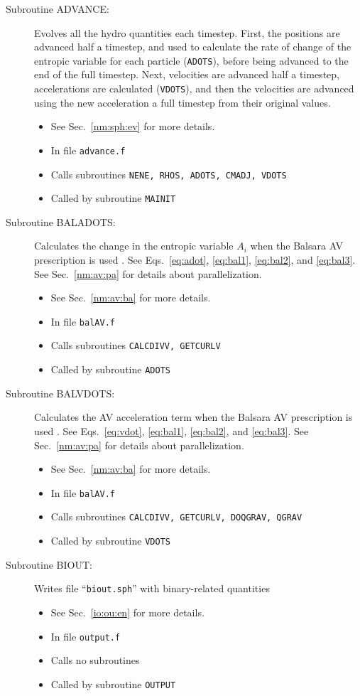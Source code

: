 \begin{description}
\item[Subroutine ADVANCE:] Evolves all the hydro quantities each timestep.
First, the positions are advanced half a timestep, and used to calculate the
rate of change of the entropic variable for each particle ({\tt ADOTS}), 
before being advanced to the end 
of the full timestep.  Next, velocities are advanced half a timestep, 
accelerations are calculated ({\tt VDOTS}), 
and then the velocities are advanced
using the new acceleration a full timestep from their original values.
\begin{itemize} 
\item See Sec.~\ref{nm:sph:ev} for more details.
\item In file {\tt advance.f}
\item Calls subroutines {\tt NENE, RHOS, ADOTS, CMADJ, VDOTS}
\item Called by subroutine {\tt MAINIT}
\end{itemize}

\item[Subroutine BALADOTS:] Calculates the change in the entropic 
variable $A_i$ when the Balsara AV prescription is used \citep{balAV}.  
See Eqs.~\ref{eq:adot}, \ref{eq:bal1}, \ref{eq:bal2}, and \ref{eq:bal3}.  
See Sec.~\ref{nm:av:pa} for
details about parallelization.
\begin{itemize} 
\item See Sec.~\ref{nm:av:ba} for more details.
\item In file {\tt balAV.f}
\item Calls subroutines {\tt CALCDIVV, GETCURLV}
\item Called by subroutine {\tt ADOTS}
\end{itemize}

\item[Subroutine BALVDOTS:] Calculates the AV acceleration term 
when the Balsara AV prescription is used \citep{balAV}.  
See Eqs.~\ref{eq:vdot}, \ref{eq:bal1}, \ref{eq:bal2}, and \ref{eq:bal3}.  
See Sec.~\ref{nm:av:pa} for
details about parallelization.
\begin{itemize} 
\item See Sec.~\ref{nm:av:ba} for more details.
\item In file {\tt balAV.f}
\item Calls subroutines {\tt CALCDIVV, GETCURLV, DOQGRAV, QGRAV}
\item Called by subroutine {\tt VDOTS}
\end{itemize}

\item[Subroutine BIOUT:] Writes file ``{\tt biout.sph}'' with 
binary-related quantities
\begin{itemize} 
\item See Sec.~\ref{io:ou:en} for more details.
\item In file {\tt output.f}
\item Calls no subroutines 
\item Called by subroutine {\tt OUTPUT}
\end{itemize}


\end{description}
